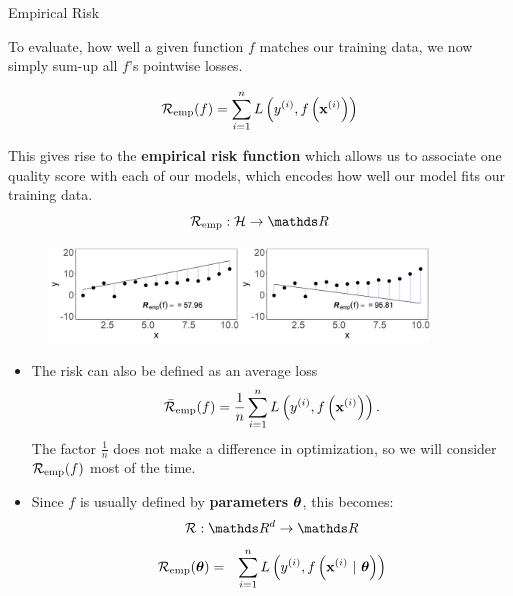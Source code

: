 \documentclass[11pt,compress,t,notes=noshow, xcolor=table]{beamer}
\begin{document}
\begin{vbframe}{Empirical Risk}

To evaluate, how well a given function $f$ matches our training data,
we now simply sum-up all $f$'s pointwise losses.
  
$$ \mathcal{R}_{\text{emp}}(f) = \sum\limits_{i=1}^n L\left(y^{(i)}, f\left(\mathbf{x}^{(i)}\right)\right) $$

This gives rise to the \textbf{empirical risk function} which allows us
to associate one quality score with each of our models,
which encodes how well our model fits our training data.
$$ \riske:  \Hspace \to \R $$  
\begin{center}
\begin{figure}[!b]
\includegraphics[width=0.9\textwidth]{figure/ml-basic_riskmin-2-risk.png}
\end{figure}
\end{center}

\framebreak 
   
\begin{itemize}
\item The risk can also be defined as an average loss
  $$
    \bar{\mathcal{R}}_{\text{emp}}(f) = \frac{1}{n}\sum\limits_{i=1}^n L\left(y^{(i)}, f\left(\mathbf{x}^{(i)}\right)\right). 
  $$
  The factor $\frac{1}{n}$ does not make a difference in optimization, so we will consider $\mathcal{R}_{\text{emp}}(f)$ most of the time.  
\item Since $f$ is usually defined by \textbf{parameters} $\bm{\theta}$, this becomes:
$$\risk : \R^d \to \R$$
\begin{eqnarray*}
\mathcal{R}_{\text{emp}}(\bm{\theta}) & = & \sum\limits_{i=1}^n L\left(y^{(i)}, f\left(\mathbf{x}^{(i)} ~|~ \bm{\theta}\right)\right) \cr
\end{eqnarray*}
 

\end{itemize}
   
   
\end{vbframe}
\end{document}
